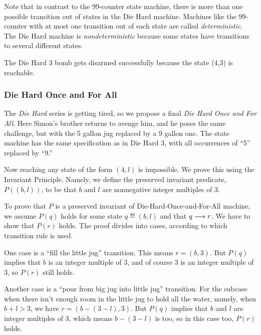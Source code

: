 Note that in contrast to the 99-counter state machine, there is more than
one possible transition out of states in the Die Hard machine.  Machines
like the 99-counter with at most one transition out of each state are
called \emph{deterministic}.  The Die Hard machine is
\emph{nondeterministic} because some states have transitions to several
different states.

The Die Hard 3 bomb gets disarmed successfully because the state (4,3)
is reachable.



\subsubsection{Die Hard Once and For All}
The \emph{Die Hard} series is getting tired, so we propose a final
\emph{Die Hard Once and For All}.  Here Simon's brother returns to
avenge him, and he poses the same challenge, but with the 5 gallon jug
replaced by a 9 gallon one.  The state machine has the same
specification as in Die Hard 3, with all occurrences of ``5'' replaced
by ``9.''

Now reaching any state of the form $(4,l)$ is impossible.  We prove this
using the Invariant Principle.  Namely, we define the preserved invariant
predicate, $P((b,l))$, to be that $b$ and $l$ are nonnegative integer
multiples of 3.

To prove that $P$ is a preserved invariant of Die-Hard-Once-and-For-All
machine, we assume $P(q)$ holds for some state $q \eqdef (b,l)$ and that
$q \mathrel{\longrightarrow} r$.  We have to show that $P(r)$ holds.  The proof divides
into cases, according to which transition rule is used.

One case is a ``fill the little jug'' transition.  This means $r =
(b,3)$.  But $P(q)$ implies that $b$ is an integer multiple of 3, and
of course 3 is an integer multiple of 3, so $P(r)$ still holds.

Another case is a ``pour from big jug into little jug'' transition.
For the subcase when there isn't enough room in the little jug to hold
all the water, namely, when $b + l > 3$, we have $r = (b -( 3 -l), 3)$.
But $P(q)$ implies that $b$ and $l$ are integer multiples of 3, which
means $b -( 3 -l)$ is too, so in this case too, $P(r)$ holds.

